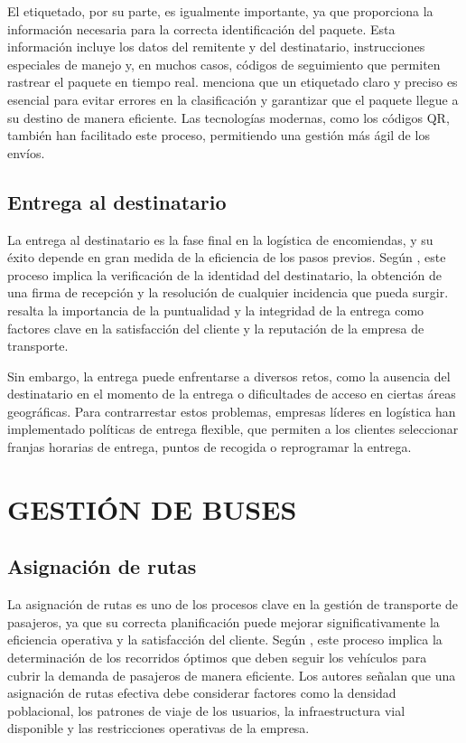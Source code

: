 		El etiquetado, por su parte, es igualmente importante, ya que proporciona la información necesaria para la correcta identificación del paquete. Esta información incluye los datos del remitente y del destinatario, instrucciones especiales de manejo y, en muchos casos, códigos de seguimiento que permiten rastrear el paquete en tiempo real. \textcite{ballou2004logistica} menciona que un etiquetado claro y preciso es esencial para evitar errores en la clasificación y garantizar que el paquete llegue a su destino de manera eficiente. Las tecnologías modernas, como los códigos QR, también han facilitado este proceso, permitiendo una gestión más ágil de los envíos.
	\subsection{Entrega al destinatario}
		La entrega al destinatario es la fase final en la logística de encomiendas, y su éxito depende en gran medida de la eficiencia de los pasos previos. Según \textcite{garcía2016gestión}, este proceso implica la verificación de la identidad del destinatario, la obtención de una firma de recepción y la resolución de cualquier incidencia que pueda surgir. \textcite{tejero2015transporte} resalta la importancia de la puntualidad y la integridad de la entrega como factores clave en la satisfacción del cliente y la reputación de la empresa de transporte.
		
		Sin embargo, la entrega puede enfrentarse a diversos retos, como la ausencia del destinatario en el momento de la entrega o dificultades de acceso en ciertas áreas geográficas. Para contrarrestar estos problemas, empresas líderes en logística han implementado políticas de entrega flexible, que permiten a los clientes seleccionar franjas horarias de entrega, puntos de recogida o reprogramar la entrega.
	\section{GESTIÓN DE BUSES}
	\subsection{Asignación de rutas}
		La asignación de rutas es uno de los procesos clave en la gestión de transporte de pasajeros, ya que su correcta planificación puede mejorar significativamente la eficiencia operativa y la satisfacción del cliente. Según \textcite{molinero2005transporte}, este proceso implica la determinación de los recorridos óptimos que deben seguir los vehículos para cubrir la demanda de pasajeros de manera eficiente. Los autores señalan que una asignación de rutas efectiva debe considerar factores como la densidad poblacional, los patrones de viaje de los usuarios, la infraestructura vial disponible y las restricciones operativas de la empresa.
		
